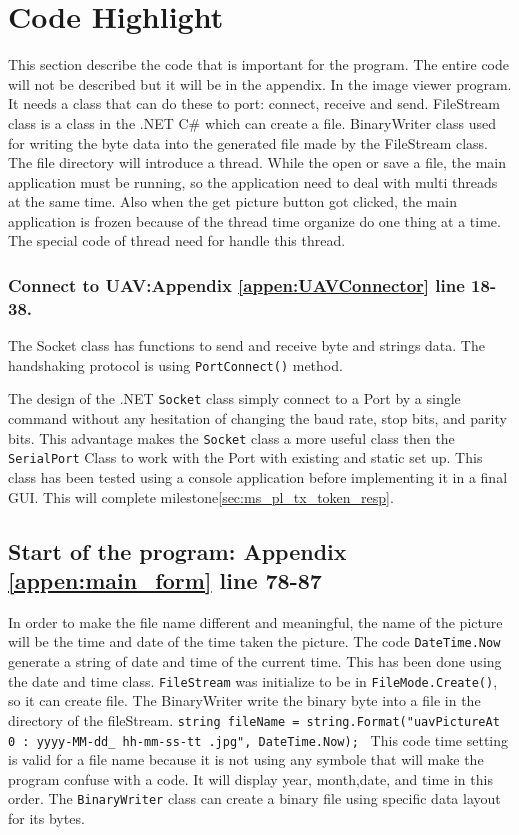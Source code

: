  
\section{Code Highlight}

This section describe the code that is important for the program. The entire code will not be described but it will be in the appendix. In the image viewer program. It needs a class that can do these to port: connect, receive and send. FileStream class is a class in the .NET C\# which can create a file. BinaryWriter class used for writing the byte data into the generated file made by the FileStream class. The file directory will introduce a thread. While the open or save a file, the main application must be running, so the application need to deal with multi threads at the same time. Also when the get picture button got clicked, the main application is frozen because of the thread time organize do one thing at a time. The special code of thread need for handle this thread. 

\subsubsection*{Connect to UAV:Appendix \ref{appen:UAVConnector} line 18-38.}
The Socket class has functions to send and receive byte and strings data. The handshaking protocol is using \texttt{PortConnect()} method.  
        
The design of the .NET \texttt{Socket} class simply connect to a Port by a single command without any hesitation of changing the baud rate, stop bits, and parity bits. 
This advantage makes the \texttt{Socket} class a more useful class then the \texttt{SerialPort} Class to work with the Port with existing and static set up. 
This class has been tested using a console application before implementing it in a final GUI. 
This will complete milestone\ref{sec:ms_pl_tx_token_resp}.

\subsection{Start of the program: Appendix \ref{appen:main_form} line 78-87}%
In order to make the file name different and meaningful, the name of the picture will be the time and date of the time taken the picture. The code \texttt{DateTime.Now} generate a string of date and time of the current time. This has been done using the date and time class. \texttt{FileStream} was initialize to be in \texttt{FileMode.Create()}, so it can create file. The BinaryWriter write the binary byte into a file in the directory of the fileStream. \texttt{string fileName = string.Format("uavPictureAt{ 0 : yyyy-MM-dd\_ hh-mm-ss-tt}
 .jpg", DateTime.Now);   }  
This code time setting is valid for a file name because it is not using any symbole that will make the program confuse with a code. 
It will display year, month,date, and time in this order. 
The \texttt{BinaryWriter} class can create a binary file using specific data layout for its bytes. 


